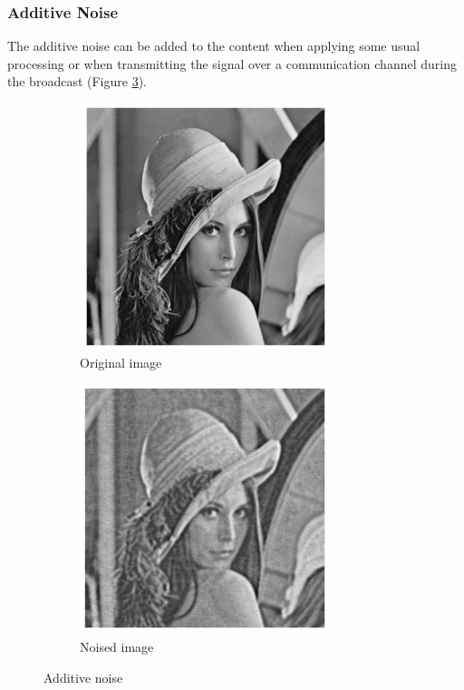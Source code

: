 \subsubsection{Additive Noise}
The additive noise can be added to the content when applying some usual processing or when transmitting the signal over a communication channel during the broadcast (Figure \ref{noise}). 

\begin{figure}[h!]
\centering
\begin{subfigure}[]{0.4\textwidth}
\centering
\includegraphics[width=0.8\textwidth]{./img/lena2.png}
\caption{\small{Original image}}
\label{fig:noise1}
\end{subfigure}%
\begin{subfigure}[]{0.4\textwidth}
\centering
\includegraphics[width=0.8\textwidth]{./img/noise.png}
\caption{\small{Noised image}}
\label{fig:noise2}
\end{subfigure}%
\caption{\small{Additive noise}\label{noise}}
\end{figure}


